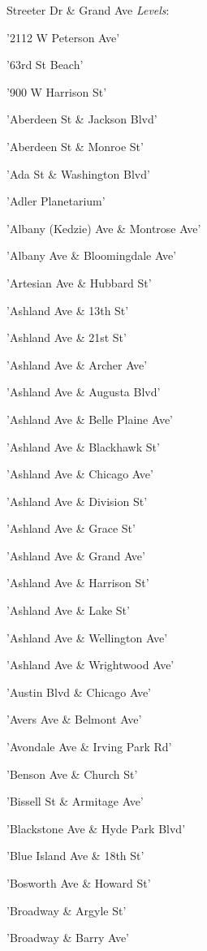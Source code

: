\documentclass[11pt]{article}
\begin{document}
    Streeter Dr \& Grand Ave
\emph{Levels}: \begin{enumerate*}
\item '2112 W Peterson Ave'
\item '63rd St Beach'
\item '900 W Harrison St'
\item 'Aberdeen St \& Jackson Blvd'
\item 'Aberdeen St \& Monroe St'
\item 'Ada St \& Washington Blvd'
\item 'Adler Planetarium'
\item 'Albany (Kedzie) Ave \& Montrose Ave'
\item 'Albany Ave \& Bloomingdale Ave'
\item 'Artesian Ave \& Hubbard St'
\item 'Ashland Ave \& 13th St'
\item 'Ashland Ave \& 21st St'
\item 'Ashland Ave \& Archer Ave'
\item 'Ashland Ave \& Augusta Blvd'
\item 'Ashland Ave \& Belle Plaine Ave'
\item 'Ashland Ave \& Blackhawk St'
\item 'Ashland Ave \& Chicago Ave'
\item 'Ashland Ave \& Division St'
\item 'Ashland Ave \& Grace St'
\item 'Ashland Ave \& Grand Ave'
\item 'Ashland Ave \& Harrison St'
\item 'Ashland Ave \& Lake St'
\item 'Ashland Ave \& Wellington Ave'
\item 'Ashland Ave \& Wrightwood Ave'
\item 'Austin Blvd \& Chicago Ave'
\item 'Avers Ave \& Belmont Ave'
\item 'Avondale Ave \& Irving Park Rd'
\item 'Benson Ave \& Church St'
\item 'Bissell St \& Armitage Ave'
\item 'Blackstone Ave \& Hyde Park Blvd'
\item 'Blue Island Ave \& 18th St'
\item 'Bosworth Ave \& Howard St'
\item 'Broadway \& Argyle St'
\item 'Broadway \& Barry Ave'

\end{enumerate*}
\end{document}
